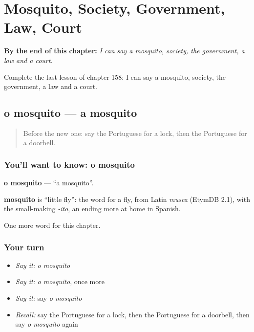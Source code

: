 
\chapter{Mosquito, Society, Government, Law, Court}
\label{ch:pt-mosquito-society-government-law-court}

\begin{chapteropening}
\textbf{By the end of this chapter:} \emph{I can say a mosquito, society, the government, a law and a court.}

Complete the last lesson of chapter 158: I can say a mosquito, society, the government, a law and a court.
\end{chapteropening}

\section[o mosquito]{o mosquito — a mosquito}

\label{lesson:PT-C158-mosquito}



\begin{quote}
Before the new one: say the Portuguese for a lock, then the Portuguese for a doorbell.
\end{quote}

\subsection*{You'll want to know: o mosquito}
\textbf{o mosquito} — \textquotedblleft{}a mosquito\textquotedblright{}.

\begin{cousinweb}
\textbf{mosquito} is \textquotedblleft{}little fly\textquotedblright{}: the word for a fly, from Latin \emph{musca} (EtymDB 2.1), with the small-making \emph{-ito}, an ending more at home in Spanish.
\end{cousinweb}

\begin{grammarlens}[title={What you've built}]
One more word for this chapter.
\end{grammarlens}

\subsection*{Your turn}
\begin{itemize}
\raggedright
  \item \emph{Say it:} \emph{o mosquito}
  \item \emph{Say it:} \emph{o mosquito}, once more
  \item \emph{Say it:} say \emph{o mosquito}
  \item \emph{Recall:} say the Portuguese for a lock, then the Portuguese for a doorbell, then say \emph{o mosquito} again
\end{itemize}

